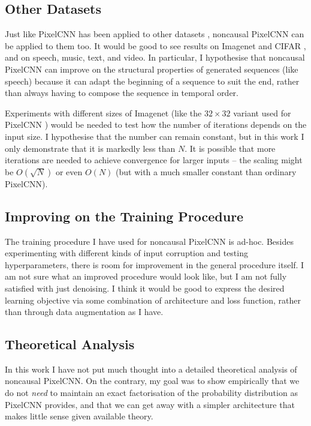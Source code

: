 \documentclass[10pt,a4paper]{article}
\begin{document}
\subsection{Other Datasets}

Just like PixelCNN has been applied to other datasets \cite{??,??,??}, noncausal PixelCNN can be applied to them too. It would be good to see results on Imagenet \cite{??} and CIFAR \cite{??}, and on speech, music, text, and video. In particular, I hypothesise that noncausal PixelCNN can improve on the structural properties of generated sequences (like speech) because it can adapt the beginning of a sequence to suit the end, rather than always having to compose the sequence in temporal order.

Experiments with different sizes of Imagenet (like the $32\times 32$ variant used for PixelCNN \cite{??}) would be needed to test how the number of iterations depends on the input size. I hypothesise that the number can remain constant, but in this work I only demonstrate that it is markedly less than $N$. It is possible that more iterations are needed to achieve convergence for larger inputs -- the scaling might be $O(\sqrt{N})$ or even $O(N)$ (but with a much smaller constant than ordinary PixelCNN).

\subsection{Improving on the Training Procedure}

The training procedure I have used for noncausal PixelCNN is ad-hoc. Besides experimenting with different kinds of input corruption and testing hyperparameters, there is room for improvement in the general procedure itself. I am not sure what an improved procedure would look like, but I am not fully satisfied with just denoising. I think it would be good to express the desired learning objective via some combination of architecture and loss function, rather than through data augmentation as I have.

\subsection{Theoretical Analysis}

In this work I have not put much thought into a detailed theoretical analysis of noncausal PixelCNN. On the contrary, my goal was to show empirically that we do not \emph{need} to maintain an exact factorisation of the probability distribution as PixelCNN provides, and that we can get away with a simpler architecture that makes little sense given available theory.
\end{document}
